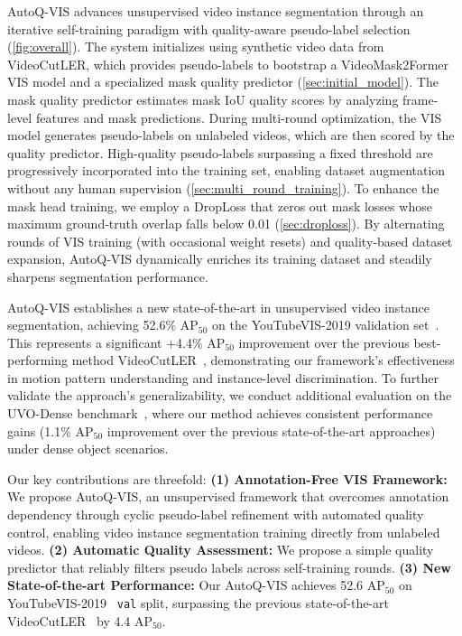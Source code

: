 AutoQ-VIS advances unsupervised video instance segmentation through an iterative self-training paradigm with quality-aware pseudo-label selection (\cref{fig:overall}). The system initializes using synthetic video data from VideoCutLER, which provides pseudo-labels to bootstrap a VideoMask2Former~\cite{mask2former, videomask2former} VIS model and a specialized mask quality predictor (\cref{sec:initial_model}). The mask quality predictor 
estimates mask IoU quality scores by analyzing frame-level features and mask predictions. During multi-round optimization, the VIS model generates pseudo-labels on unlabeled videos, which are then scored by the quality predictor. High-quality pseudo-labels surpassing a fixed threshold are progressively incorporated into the training set, enabling dataset augmentation without any human supervision (\cref{sec:multi_round_training}). To enhance the mask head training, we employ a DropLoss that zeros out mask losses whose maximum ground‑truth overlap falls below 0.01 (\cref{sec:droploss}).  By alternating rounds of VIS training (with occasional weight resets) and quality‑based dataset expansion, AutoQ‑VIS dynamically enriches its training dataset and steadily sharpens segmentation performance. 

AutoQ-VIS establishes a new state-of-the-art in unsupervised video instance segmentation, achieving 52.6\% $\text{AP}_{50}$ on the YouTubeVIS-2019 validation set~\cite{ytvis2019}. This represents a significant +4.4\% $\text{AP}_{50}$ improvement over the previous best-performing method VideoCutLER~\cite{videocutler}, demonstrating our framework's effectiveness in motion pattern understanding and instance-level discrimination. To further validate the approach's generalizability, we conduct additional evaluation on the UVO-Dense benchmark~\cite{uvo}, where our method achieves consistent performance gains (1.1\% $\text{AP}_{50}$ improvement over the previous state-of-the-art approaches) under dense object scenarios.

Our key contributions are threefold: \textbf{(1) Annotation-Free VIS Framework:} We propose AutoQ-VIS, an unsupervised framework that overcomes annotation dependency through cyclic pseudo-label refinement with automated quality control, enabling video instance segmentation training directly from unlabeled videos. \textbf{(2) Automatic Quality Assessment:} We propose a simple quality predictor that reliably filters pseudo labels across self-training rounds. \textbf{(3) New State-of-the-art Performance:} Our AutoQ-VIS achieves 52.6 ${\text{AP}_{50}}$ on YouTubeVIS-2019~\cite{ytvis2019} \texttt{val} split, surpassing the previous state-of-the-art VideoCutLER~\cite{videocutler} by 4.4 ${\text{AP}_{50}}$.